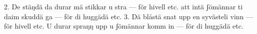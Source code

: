 2.  De stäŋdä da durar mä stikkar u stra — för hivell etc.
    att intä ʃömännar ti daim skuddä ga — för di huggädä etc.
3.  Dä blåstä snat upp en syvästeli vinn — för hivell etc.
    U durar spraŋŋ upp u ʃömännar komm in — för di huggädä etc.
